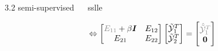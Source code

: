 \documentclass[11pt, compress, t, notes = noshow, xcolor = table, 
aspectratio = 1610]{beamer}
\newcommand{\Y}{\mathcal{Y}}
\newcommand{\Ytil}{\tilde{\Y}}
\newcommand{\I}{\bm{I}}
\begin{document}
\begin{frame}{\textcolor{gray!90}{3.2 semi-supervised} ~~ sslle}
\begin{fleqn}
  \begin{equation}
    \Leftrightarrow \begin{bmatrix} \textcolor{gray!90}{E_{11}} +
    \beta \I & E_{12} \\ E_{21} & E_{22} \end{bmatrix}
    \begin{bmatrix} \Ytil_1^T \\ \Ytil_2^T \end{bmatrix} =
    \begin{bmatrix} \textcolor{gray!90}{\hat{\Ytil}_1^T} \\ \bm{0} 
    \end{bmatrix}
  \end{equation}
\end{fleqn}

\end{frame}

\end{document}
